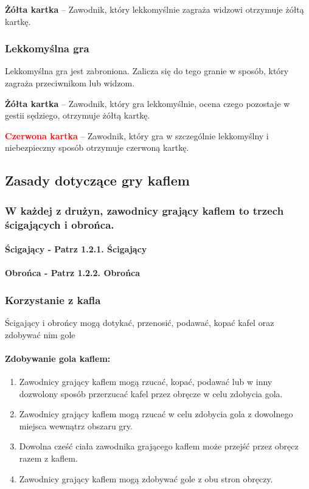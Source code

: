 \documentclass[12pt]{article}
\newcommand\redcard[1]{\bgroup\textcolor{red}{\textbf{#1}}}
\newcommand\yellowcard[1]{\bgroup\textcolor{darkyellow}{\textbf{#1}}}
\begin{document}
\yellowcard{Żółta kartka} -- Zawodnik, który lekkomyślnie zagraża widzowi
otrzymuje żółtą kartkę.

\subsubsection{Lekkomyślna gra}

Lekkomyślna gra jest zabroniona. Zalicza się do tego granie w sposób,
który zagraża przeciwnikom lub widzom.

\yellowcard{Żółta kartka} -- Zawodnik, który gra lekkomyślnie, ocena czego
pozostaje w gestii sędziego, otrzymuje żółtą kartkę.

\redcard{Czerwona kartka} -- Zawodnik, który gra w szczególnie lekkomyślny i
niebezpieczny sposób otrzymuje czerwoną kartkę.

\subsection{Zasady dotyczące gry kaflem}

\subsubsection{W każdej z drużyn, zawodnicy grający kaflem to trzech ścigających
	i obrońca.}

\paragraph{Ścigający - Patrz 1.2.1. Ścigający}

\paragraph{Obrońca - Patrz 1.2.2. Obrońca}

\subsubsection{Korzystanie z kafla}

Ścigający i obrońcy mogą dotykać, przenosić, podawać, kopać kafel oraz
zdobywać nim gole

\paragraph{Zdobywanie gola kaflem:}

\begin{enumerate}
	\item
	      Zawodnicy grający kaflem mogą rzucać, kopać, podawać lub w inny
	      dozwolony sposób przerzucać kafel przez obręcze w celu zdobycia gola.
	\item
	      Zawodnicy grający kaflem mogą rzucać w celu zdobycia gola z dowolnego
	      miejsca wewnątrz obszaru gry.
	\item
	      Dowolna cześć ciała zawodnika grającego kaflem może przejść przez
	      obręcz razem z kaflem.
	\item
	      Zawodnicy grający kaflem mogą zdobywać gole z obu stron obręczy.
\end{enumerate}
\end{document}
